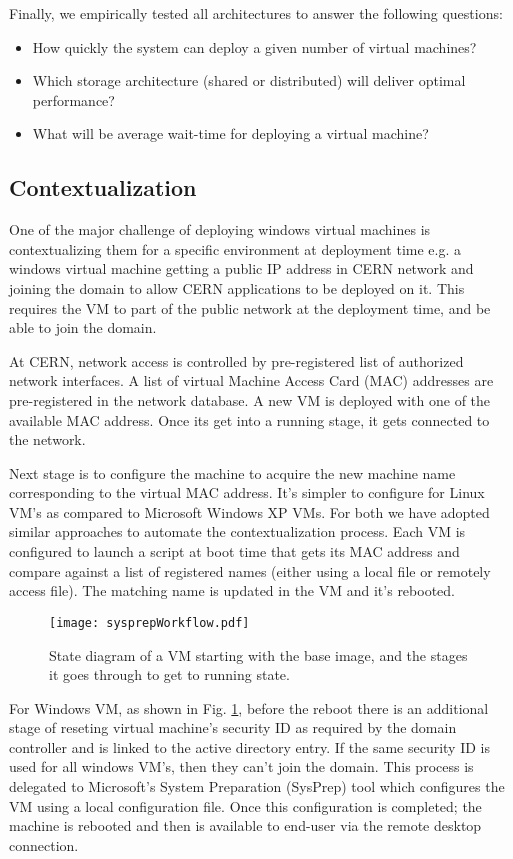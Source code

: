 \documentclass[acus]{JAC2003}
\begin{document}
Finally, we empirically tested all architectures to answer the following questions:

\begin {itemize}
\item How quickly the system can deploy a given number of virtual machines?
\item Which storage architecture (shared or distributed) will deliver optimal performance?
\item What will be average wait-time for deploying a virtual machine?
\end {itemize}

\subsection{Contextualization}

One of the major challenge of deploying windows virtual machines is contextualizing them for a specific environment at deployment time e.g. a windows virtual machine getting a public IP address in CERN network and joining the domain to allow CERN applications to be deployed on it. This requires the VM to part of the public network at the deployment time, and be able to join the domain.

At CERN, network access is controlled by pre-registered list of authorized network interfaces. A list of virtual Machine Access Card (MAC) addresses are pre-registered in the network database. A new VM is deployed with one of the available MAC address. Once its get into a running stage, it gets connected to the network.

Next stage is to configure the machine to acquire the new machine name corresponding to the virtual MAC address. It's simpler to configure for Linux VM's as compared to Microsoft Windows XP VMs. For both we have adopted similar approaches to automate the contextualization process. Each VM is configured to launch a script at boot time that gets its MAC address and compare against a list of registered names (either using a local file or remotely access file). The matching name is updated in the VM and it's rebooted.

\begin{figure}[htb]
   \centering
   \texttt{[image: sysprepWorkflow.pdf]}
   \caption{State diagram of a VM starting with the base image, and the stages it goes through to get to running state.}
   \label{sysprep}
\end{figure}

For Windows VM, as shown in Fig.  \ref{sysprep}, before the reboot there is an additional stage of reseting virtual machine's security ID as required by the domain controller and is linked to the active directory entry. If the same security ID is used for all windows VM's, then they can't join the domain. This process is delegated to Microsoft's System Preparation (SysPrep) tool which configures the VM using a local configuration file. Once this configuration is completed; the machine is rebooted and then is available to end-user via the remote desktop connection.
\end{document}
